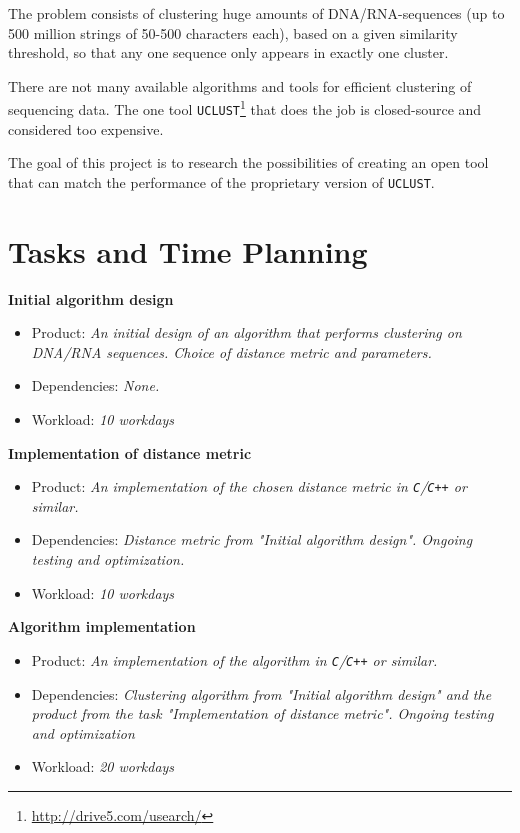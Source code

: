 \documentclass[12pt,a4paper]{article}
\begin{document}
The problem consists of clustering huge amounts of DNA/RNA-sequences (up to 500
million strings of 50-500 characters each), based on a given similarity
threshold, so that any one sequence only appears in exactly one cluster.
 
There are not many available algorithms and tools for efficient clustering of
sequencing data. The one tool
\texttt{UCLUST}\footnote{\url{http://drive5.com/usearch/}} that does the job is
closed-source and considered too expensive. %

The goal of this project is to research the possibilities of creating an open
tool that can match the performance of the proprietary version of
\texttt{UCLUST}.


\section{Tasks and Time Planning}
\textbf{Initial algorithm design}
\begin{itemize}
  \item Product: \textit{An initial design of an algorithm that performs
    clustering on DNA/RNA sequences. Choice of distance metric and parameters.}
  \item Dependencies: \textit{None.}
  \item Workload: \textit{10 workdays}
\end{itemize}

\noindent
\textbf{Implementation of distance metric}
\begin{itemize}
  \item Product: \textit{An implementation of the chosen distance metric in
    \texttt{C}/\texttt{C++} or similar.}
  \item Dependencies: \textit{Distance metric from "Initial algorithm design".
    Ongoing testing and optimization.}
  \item Workload: \textit{10 workdays}
\end{itemize}

\noindent
\textbf{Algorithm implementation}
\begin{itemize}
  \item Product: \textit{An implementation of the algorithm in
    \texttt{C}/\texttt{C++} or similar.}
  \item Dependencies: \textit{Clustering algorithm from "Initial algorithm
    design" and the product from the task "Implementation of distance metric".
    Ongoing testing and optimization}
  \item Workload: \textit{20 workdays}
\end{itemize}
\end{document}
